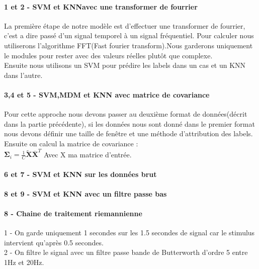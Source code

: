 \documentclass{article}
\begin{document}
\paragraph{1 et 2 - SVM et KNNavec une transformer de fourrier}
La première étape de notre modèle est d'effectuer une transformer de fourrier, c'est a dire passé d'un signal temporel à un signal fréquentiel. Pour calculer nous utiliserons l'algorithme FFT(Fast fourier transform).Nous garderons uniquement le modules pour rester avec des valeurs réelles plutôt que complexe.\\

Ensuite nous utilisons un SVM pour prédire les labels dans un cas et un KNN dans l'autre.
\paragraph{3,4 et 5 - SVM,MDM et KNN avec matrice de covariance }
Pour cette approche nous devons passer au deuxième format de données(décrit dans la partie précédente), si les données nous sont donné dans le premier format nous devons définir une taille de fenêtre et une méthode d'attribution des labels.\\
Ensuite on calcul la matrice de covariance :\\
$
\mathbf{\Sigma}_{i}=\frac{1}{C} \tilde{\mathbf{X}} \overline{\mathbf{X}}^{T}
$
Avec X ma matrice d'entrée.
\paragraph{6 et 7 - SVM et KNN sur les données brut}

\paragraph{8 et 9 - SVM et KNN avec un filtre passe bas}

\paragraph{8 - Chaine de traitement riemannienne}
1 - On garde uniquement 1 secondes sur les 1.5 secondes de signal car le stimulus intervient qu’après 0.5 secondes. \\
2 - On filtre le signal avec un filtre passe bande de Butterworth d'ordre 5 entre 1Hz et 20Hz.\\
\end{document}
